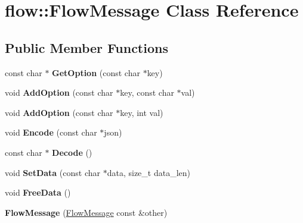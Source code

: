 \hypertarget{classflow_1_1_flow_message}{}\section{flow\+:\+:Flow\+Message Class Reference}
\label{classflow_1_1_flow_message}
\subsection*{Public Member Functions}
\begin{DoxyCompactItemize}
\item 
const char $\ast$ {\bfseries Get\+Option} (const char $\ast$key)\hypertarget{classflow_1_1_flow_message_a6dbb91b73488e4e048a39394cacd1144}{}\label{classflow_1_1_flow_message_a6dbb91b73488e4e048a39394cacd1144}

\item 
void {\bfseries Add\+Option} (const char $\ast$key, const char $\ast$val)\hypertarget{classflow_1_1_flow_message_a1c7d5a8e8346d4787a883d6c56b63c24}{}\label{classflow_1_1_flow_message_a1c7d5a8e8346d4787a883d6c56b63c24}

\item 
void {\bfseries Add\+Option} (const char $\ast$key, int val)\hypertarget{classflow_1_1_flow_message_a67db8161783762a9af27c8e41161dc73}{}\label{classflow_1_1_flow_message_a67db8161783762a9af27c8e41161dc73}

\item 
void {\bfseries Encode} (const char $\ast$json)\hypertarget{classflow_1_1_flow_message_a0dabba9f74898797570d9839e7742c66}{}\label{classflow_1_1_flow_message_a0dabba9f74898797570d9839e7742c66}

\item 
const char $\ast$ {\bfseries Decode} ()\hypertarget{classflow_1_1_flow_message_a7aed85c7cf94c29ed8fd2edb765b0af9}{}\label{classflow_1_1_flow_message_a7aed85c7cf94c29ed8fd2edb765b0af9}

\item 
void {\bfseries Set\+Data} (const char $\ast$data, size\+\_\+t data\+\_\+len)\hypertarget{classflow_1_1_flow_message_abb32b32dd3c75eb35c0383b296b7a5ba}{}\label{classflow_1_1_flow_message_abb32b32dd3c75eb35c0383b296b7a5ba}

\item 
void {\bfseries Free\+Data} ()\hypertarget{classflow_1_1_flow_message_a7c20f79943ac3344699b01bff1e2b5be}{}\label{classflow_1_1_flow_message_a7c20f79943ac3344699b01bff1e2b5be}

\item 
{\bfseries Flow\+Message} (\hyperlink{classflow_1_1_flow_message}{Flow\+Message} const \&other)\hypertarget{classflow_1_1_flow_message_a5809d23421d33a525ebd84a130c5313b}{}\label{classflow_1_1_flow_message_a5809d23421d33a525ebd84a130c5313b}

\end{DoxyCompactItemize}
